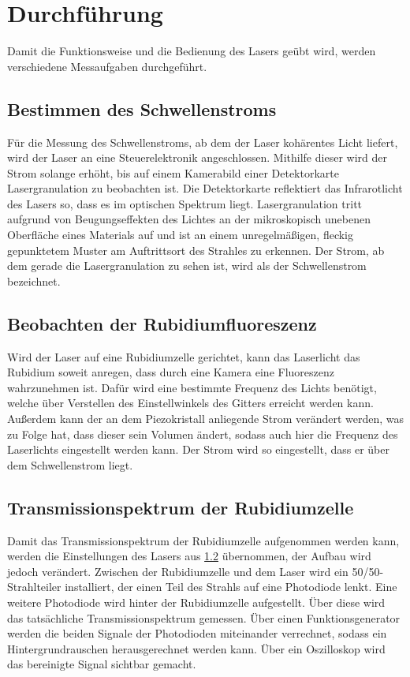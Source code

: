 \section{Durchführung}
\label{sec:Durchführung}
Damit die Funktionsweise und die Bedienung des Lasers geübt wird, werden verschiedene Messaufgaben durchgeführt.


\subsection{Bestimmen des Schwellenstroms}
\label{subsec:Schwellenstrom}
Für die Messung des Schwellenstroms, ab dem der Laser kohärentes Licht liefert, wird der Laser an eine Steuerelektronik angeschlossen. Mithilfe
dieser wird der Strom solange erhöht, bis auf einem Kamerabild einer Detektorkarte Lasergranulation zu beobachten ist. Die Detektorkarte reflektiert das Infrarotlicht
des Lasers so, dass es im optischen Spektrum liegt. Lasergranulation tritt aufgrund von Beugungseffekten des Lichtes an der mikroskopisch unebenen Oberfläche eines Materials auf
und ist an einem unregelmäßigen, fleckig gepunktetem Muster am Auftrittsort des Strahles zu erkennen.
Der Strom, ab dem gerade die Lasergranulation zu sehen ist, wird als der Schwellenstrom bezeichnet.


\subsection{Beobachten der Rubidiumfluoreszenz}
\label{subsec:Rubidiumfluoreszenz}
Wird der Laser auf eine Rubidiumzelle gerichtet, kann das Laserlicht das Rubidium soweit anregen, dass durch eine Kamera eine Fluoreszenz wahrzunehmen ist.
Dafür wird eine bestimmte Frequenz des Lichts benötigt, welche über Verstellen des Einstellwinkels des Gitters erreicht werden kann. Außerdem kann der an dem
Piezokristall anliegende Strom verändert werden, was zu Folge hat, dass dieser sein Volumen ändert, sodass auch hier die Frequenz des Laserlichts eingestellt
werden kann. Der Strom wird so eingestellt, dass er über dem Schwellenstrom liegt.


\subsection{Transmissionspektrum der Rubidiumzelle}
Damit das Transmissionspektrum der Rubidiumzelle aufgenommen werden kann, werden die Einstellungen des Lasers aus \ref{subsec:Rubidiumfluoreszenz} übernommen, der
Aufbau wird jedoch verändert. Zwischen der Rubidiumzelle und dem Laser wird ein 50/50-Strahlteiler installiert, der einen Teil des Strahls auf eine Photodiode lenkt.
Eine weitere Photodiode wird hinter der Rubidiumzelle aufgestellt. Über diese wird das tatsächliche Transmissionspektrum gemessen. Über einen Funktionsgenerator werden
die beiden Signale der Photodioden miteinander verrechnet, sodass ein Hintergrundrauschen herausgerechnet werden kann. Über ein Oszilloskop wird das bereinigte Signal
sichtbar gemacht.

